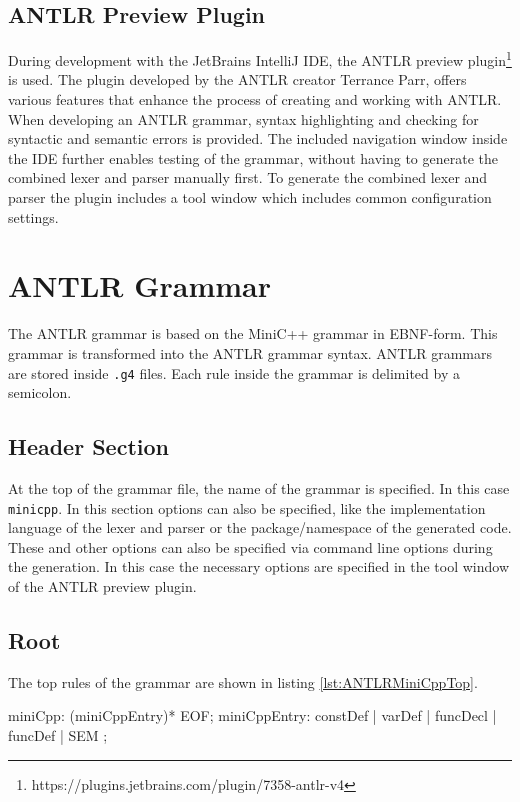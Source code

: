 \subsection{ANTLR Preview Plugin}

During development with the JetBrains IntelliJ IDE, the ANTLR preview plugin\footnote{https://plugins.jetbrains.com/plugin/7358-antlr-v4} is used. The plugin developed by the ANTLR creator Terrance Parr, offers various features that enhance the process of creating and working with ANTLR. When developing an ANTLR grammar, syntax highlighting and checking for syntactic and semantic errors is provided. The included navigation window inside the IDE further enables testing of the grammar, without having to generate the combined lexer and parser manually first. To generate the combined lexer and parser the plugin includes a tool window which includes common configuration settings.

\section{ANTLR Grammar}

The ANTLR grammar is based on the MiniC++ grammar in EBNF-form. This grammar is transformed into the ANTLR grammar syntax. ANTLR grammars are stored inside \texttt{.g4} files. Each rule inside the grammar is delimited by a semicolon. 

\subsection{Header Section}

At the top of the grammar file, the name of the grammar is specified. In this case \texttt{minicpp}. In this section options can also be specified, like the implementation language of the lexer and parser or the package/namespace of the generated code. These and other options can also be specified via command line options during the generation. In this case the necessary options are specified in the tool window of the ANTLR preview plugin. 


\subsection{Root}

The top rules of the grammar are shown in listing \ref{lst:ANTLRMiniCppTop}. 


\begin{AntlrCode}[float,numbers=none,caption=Top rules of the MiniC++ ANTLR grammar., label=lst:ANTLRMiniCppTop]
    miniCpp:     (miniCppEntry)* EOF;
    miniCppEntry:     constDef
                    | varDef
                    | funcDecl
                    | funcDef
                    | SEM
                    ;
\end{AntlrCode}



